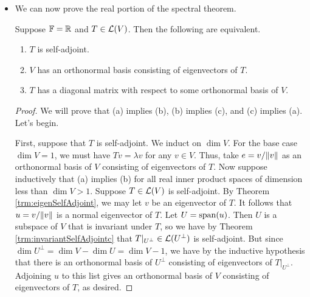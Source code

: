 \documentclass[../main.tex]{subfiles}
\begin{document}
\begin{itemize}
\begin{theorem}
\begin{enumerate}[label={\textup{(}\alph*\textup{)}},ref={\thetheorem\alph*}]
\begin{proof}
                If $u,v\in U$, then
                \begin{equation*}
                    \inp{(T|_U)u}{v} = \inp{Tu}{v} = \inp{u}{Tv} = \inp{u}{(T|_U)v}
                \end{equation*}
                as desired.
            \end{proof}
            \item \label{trm:invariantSelfAdjointc}$T|_{U^\perp}\in\ope{U^\perp}$ is self-adjoint.
            \begin{proof}
                The proof is symmetric to that of Theorem \ref{trm:invariantSelfAdjointb}.
            \end{proof}
        \end{enumerate}
    \end{theorem}
    \item We can now prove the real portion of the spectral theorem.
    \begin{theorem}\label{trm:RealSpectral}
        Suppose $\mathbb{F}=\mathbb{R}$ and $T\in\mathcal{L}(V)$. Then the following are equivalent.
        \begin{enumerate}[label={\textup{(}\alph*\textup{)}}]
            \item $T$ is self-adjoint.
            \item $V$ has an orthonormal basis consisting of eigenvectors of $T$.
            \item $T$ has a diagonal matrix with respect to some orthonormal basis of $V$.
        \end{enumerate}
        \begin{proof}
            We will prove that (a) implies (b), (b) implies (c), and (c) implies (a). Let's begin.\par
            First, suppose that $T$ is self-adjoint. We induct on $\dim V$. For the base case $\dim V=1$, we must have $Tv=\lambda v$ for any $v\in V$. Thus, take $e=v/\norm{v}$ as an orthonormal basis of $V$ consisting of eigenvectors of $T$. Now suppose inductively that (a) implies (b) for all real inner product spaces of dimension less than $\dim V>1$. Suppose $T\in\mathcal{L}(V)$ is self-adjoint. By Theorem \ref{trm:eigenSelfAdjoint}, we may let $v$ be an eigenvector of $T$. It follows that $u=v/\norm{v}$ is a normal eigenvector of $T$. Let $U=\operatorname{span}(u)$. Then $U$ is a subspace of $V$ that is invariant under $T$, so we have by Theorem \ref{trm:invariantSelfAdjointc} that $T|_{U^\perp}\in\ope{U^\perp}$ is self-adjoint. But since $\dim U^\perp=\dim V-\dim U=\dim V-1$, we have by the inductive hypothesis that there is an orthonormal basis of $U^\perp$ consisting of eigenvectors of $T|_{U^\perp}$. Adjoining $u$ to this list gives an orthonormal basis of $V$ consisting of eigenvectors of $T$, as desired.\par

\end{proof}
\end{theorem}
\end{itemize}
\end{document}
